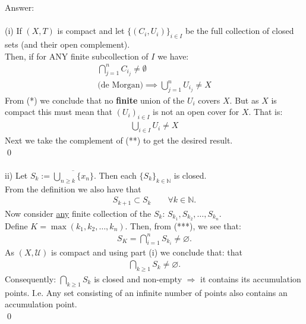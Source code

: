 \documentclass[12pt]{article}
\begin{document}
\vspace{1cm}
\noindent
Answer:\\
\\
(i) If $(X,T)$ is compact and let $\{(C_i,U_i)\}_{i\in I}$ be the full collection of closed sets (and their open complement).\\
Then, if for ANY finite subcollection of $I$ we have:
\begin{align*}
    \bigcap_{j=1}^n C_{i_j} \neq \emptyset \\
    \text{(de Morgan)} \implies \bigcup_{j=1}^n U_{i_j} \neq X \tag{*}
\end{align*}
From (*) we conclude that no \textbf{finite} union of the $U_{i}$ covers $X$.  But as $X$ is compact this must mean that $(U_i)_{i \in I}$ is not an open cover for $X$.
That is:
\begin{align*}
     \bigcup_{i \in I}U_{i} \ne X \tag{**}
\end{align*}
Next we take the complement of (**) to get the desired result.\\
\qed\\
\\
ii) Let $S_k:=\overline{\bigcup_{n \geq k}\{x_n\}}$.  Then each $\{S_k\}_{k\in\mathbb{N}}$ is closed.\\
From the definition we also have that
\begin{align*}
S_{k+1} \subset S_k \qquad \forall k\in\mathbb{N}.  \tag{***}
\end{align*}
Now consider \underline{any} finite collection of the $S_k$:
$S_{k_1},S_{k_2},\ldots,S_{k_n}$.\\
Define $K=\max(k_1,k_2,\ldots,k_n)$. Then, from (***), we see that:
\begin{align*}
S_K=\bigcap_{i=1}^{n}S_{k_i}\neq\varnothing.
\end{align*}
As $(X,\mathcal{U})$ is compact and using part (i) we conclude that:
that
\begin{align*}
\bigcap_{k\geq1}S_k\neq\varnothing.
\end{align*}
Consequently: $\bigcap_{k\geq1}S_k$ is closed and non-empty $\Rightarrow$ it contains its accumulation points. I.e. Any set consisting of an infinite number of points also contains an accumulation point.\\
\qed
\end{document}
